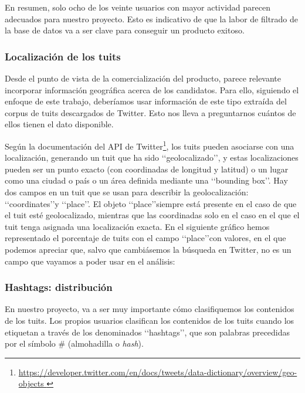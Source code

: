 En resumen, solo ocho de los veinte usuarios con mayor actividad parecen adecuados para
nuestro proyecto. Esto es indicativo de que la labor de filtrado de la base de datos
va a ser clave para conseguir un producto exitoso.

\subsubsection{Localización de los tuits}
Desde el punto de vista de la comercialización del producto, parece relevante incorporar información geográfica acerca de los candidatos. Para ello, siguiendo el enfoque de este trabajo, deberíamos usar información de este tipo extraída del corpus de tuits descargados de Twitter. Esto nos lleva a preguntarnos cuántos de ellos tienen el dato disponible. 

Según la documentación del API de Twitter\footnote{\url{https://developer.twitter.com/en/docs/tweets/data-dictionary/overview/geo-objects }},
los tuits pueden asociarse con una localización, generando un tuit que ha sido \lq\lq geolocalizado\rq\rq, y estas localizaciones pueden ser un punto exacto (con coordinadas de longitud y latitud) o un lugar como una ciudad o país o un área definida mediante una \lq\lq bounding box\rq\rq. Hay dos campos en un tuit que se usan para describir la geolocalización: \lq\lq coordinates\rq\rq y \lq\lq place\rq\rq. El objeto \lq\lq place\rq\rq siempre está presente en el caso de que el tuit esté geolocalizado, mientras que las coordinadas solo en el caso en el que el tuit tenga asignada una localización exacta. En el siguiente gráfico hemos 
representado el porcentaje de tuits con el campo \lq\lq place\rq\rq con valores, en el que
podemos apreciar que, salvo que cambiásemos la búsqueda en Twitter, no es un campo que vayamos a poder usar en el análisis:




\subsubsection{Hashtags: distribución}
En nuestro proyecto, va a ser muy importante cómo clasifiquemos los contenidos de los tuits. 
Los propios usuarios clasifican los contenidos de los tuits cuando los etiquetan a través
de los denominados \lq\lq hashtags\rq\rq,  que son palabras precedidas por el símbolo \# 
(almohadilla o {\em hash}).


